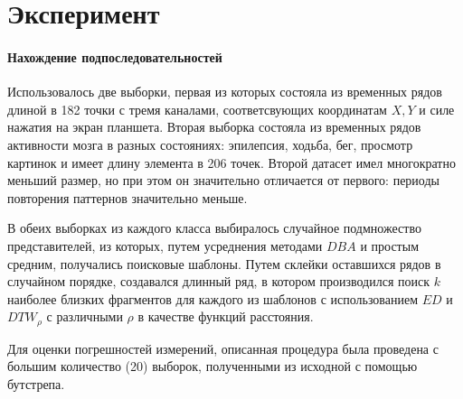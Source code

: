 \documentclass[12pt,twoside]{article}
\begin{document}
    \section{Эксперимент}

        \paragraph{Нахождение подпоследовательностей}
        Использовалось две выборки, первая из которых состояла из временных рядов длиной в 182 точки с тремя каналами, соответсвующих координатам $X, Y$ 
            и силе нажатия на экран планшета.
        Вторая выборка состояла из временных рядов активности мозга в разных состояниях: эпилепсия, ходьба, бег, просмотр картинок и имеет длину элемента в 206 точек.
        Второй датасет имел многократно меньший размер, но при этом он значительно отличается от первого: периоды повторения паттернов значительно меньше.

        В обеих выборках из каждого класса выбиралось случайное подмножество представителей, из которых,
            путем усреднения методами $DBA$ и простым средним, получались поисковые шаблоны. 
        Путем склейки оставшихся рядов в случайном порядке, создавался длинный ряд, в котором производился поиск $k$ наиболее близких фрагментов 
            для каждого из шаблонов с использованием $ED$ и $DTW_\rho$ с различными $\rho$ в качестве функций расстояния.
            
        Для оценки погрешностей измерений, описанная процедура была проведена с большим количество (20) выборок, полученными из исходной с помощью бутстрепа.    
    
\end{document}
